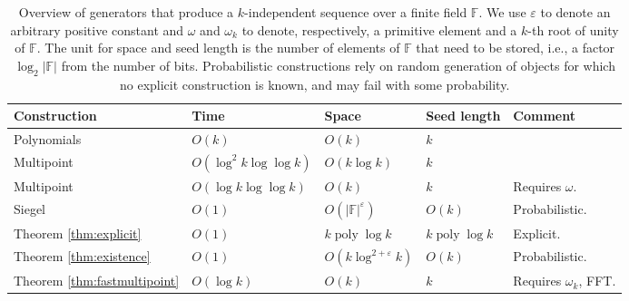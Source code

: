 \documentclass[a4paper,11pt]{article}
\theoremstyle{plain}
\theoremstyle{definition}
\newcommand{\F}{\mathbb{F}}
\DeclareMathOperator{\poly}{poly}
\begin{document}
\begin{table}[htpb]
  \centering
  \small
    \begin{tabular}{lllll}
    \toprule
	{\bf Construction}                        & {\bf Time}               & {\bf Space}                     & {\bf Seed length}    & {\bf Comment}  \\ \midrule
    Polynomials \cite{joffe1974,wegman1981}   & $O(k)$                   & $O(k)$                          & $k$                  & \\
	Multipoint \cite{gathen2013}              & $O(\log^2 k \log\log k)$ & $O(k \log k)$                   & $k$			      & \\
	Multipoint \cite{bostan2005}              & $O(\log k \log\log k)$   & $O(k)$                          & $k$		          & Requires $\omega$. \\ Siegel \cite{siegel2004}                  & $O(1)$                   & $O(|\F|^{\varepsilon})$         & $O(k)$               & Probabilistic. \\
	Theorem \ref{thm:explicit}                & $O(1)$                   & $k \poly \log k$                & $k \poly  \log k$    & Explicit.  \\
	Theorem \ref{thm:existence}               & $O(1)$                   & $O(k \log^{2 + \varepsilon}k)$  & $O(k)$               & Probabilistic. \\
	Theorem \ref{thm:fastmultipoint}          & $O(\log k)$              & $O(k)$                          & $k$
    & Requires $\omega_{k}$, FFT. \\
   \bottomrule
    \end{tabular}
\caption{
Overview of generators that produce a $k$-independent sequence over a finite field $\F$. 
We use $\varepsilon$ to denote an arbitrary positive constant and $\omega$ and $\omega_{k}$ to denote, respectively, a primitive element and a $k$-th root of unity of $\F$.
The unit for space and seed length is the number of elements of $\F$ that need to be stored, i.e., a factor $\log_2 |\F|$ from the number of bits. 
Probabilistic constructions rely on random generation of objects for which no explicit construction is known, and may fail with some probability.
}
\label{tab:results}
\end{table}
\end{document}
